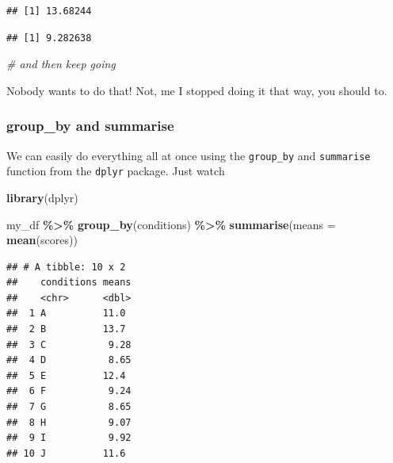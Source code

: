 \documentclass[
]{book}
\newenvironment{Shaded}{\begin{snugshade}}{\end{snugshade}}
\newcommand{\AttributeTok}[1]{\textcolor[rgb]{0.13,0.29,0.53}{#1}}
\newcommand{\CommentTok}[1]{\textcolor[rgb]{0.56,0.35,0.01}{\textit{#1}}}
\newcommand{\FunctionTok}[1]{\textcolor[rgb]{0.13,0.29,0.53}{\textbf{#1}}}
\newcommand{\NormalTok}[1]{#1}
\newcommand{\SpecialCharTok}[1]{\textcolor[rgb]{0.81,0.36,0.00}{\textbf{#1}}}
\newcommand{\StringTok}[1]{\textcolor[rgb]{0.31,0.60,0.02}{#1}}
\begin{document}
\begin{verbatim}
## [1] 13.68244
\end{verbatim}

\begin{Shaded}
\end{Shaded}

\begin{verbatim}
## [1] 9.282638
\end{verbatim}

\begin{Shaded}
\begin{Highlighting}[]
\CommentTok{\# and then keep going}
\end{Highlighting}
\end{Shaded}

Nobody wants to do that! Not, me I stopped doing it that way, you should to.

\hypertarget{group_by-and-summarise}{%
\subsubsection{group\_by and summarise}\label{group_by-and-summarise}}

We can easily do everything all at once using the \texttt{group\_by} and \texttt{summarise} function from the \texttt{dplyr} package. Just watch

\begin{Shaded}
\begin{Highlighting}[]
\FunctionTok{library}\NormalTok{(dplyr)}

\NormalTok{my\_df }\SpecialCharTok{\%\textgreater{}\%}
  \FunctionTok{group\_by}\NormalTok{(conditions) }\SpecialCharTok{\%\textgreater{}\%}
  \FunctionTok{summarise}\NormalTok{(}\AttributeTok{means =} \FunctionTok{mean}\NormalTok{(scores))}
\end{Highlighting}
\end{Shaded}

\begin{verbatim}
## # A tibble: 10 x 2
##    conditions means
##    <chr>      <dbl>
##  1 A          11.0 
##  2 B          13.7 
##  3 C           9.28
##  4 D           8.65
##  5 E          12.4 
##  6 F           9.24
##  7 G           8.65
##  8 H           9.07
##  9 I           9.92
## 10 J          11.6
\end{verbatim}
\end{document}
